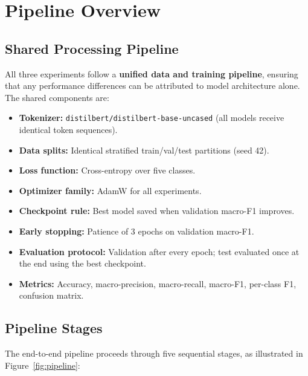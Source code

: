 \section{Pipeline Overview}

\subsection{Shared Processing Pipeline}

All three experiments follow a \textbf{unified data and training pipeline}, ensuring that any performance differences can be attributed to model architecture alone. The shared components are:

\begin{itemize}
    \item \textbf{Tokenizer:} \texttt{distilbert/distilbert-base-uncased} (all models receive identical token sequences).
    \item \textbf{Data splits:} Identical stratified train/val/test partitions (seed 42).
    \item \textbf{Loss function:} Cross-entropy over five classes.
    \item \textbf{Optimizer family:} AdamW for all experiments.
    \item \textbf{Checkpoint rule:} Best model saved when validation macro-F1 improves.
    \item \textbf{Early stopping:} Patience of 3 epochs on validation macro-F1.
    \item \textbf{Evaluation protocol:} Validation after every epoch; test evaluated once at the end using the best checkpoint.
    \item \textbf{Metrics:} Accuracy, macro-precision, macro-recall, macro-F1, per-class F1, confusion matrix.
\end{itemize}

\subsection{Pipeline Stages}

The end-to-end pipeline proceeds through five sequential stages, as illustrated in Figure~\ref{fig:pipeline}:

